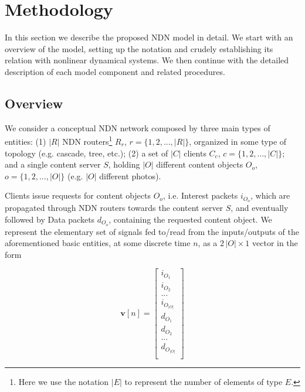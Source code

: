 \section{Methodology}
\label{sec:methodology}

In this section we describe the proposed NDN model in detail. We start with 
an overview of the model, setting up the notation and crudely establishing its relation 
with nonlinear dynamical systems. We then continue with the detailed description of 
each model component and related procedures.

\subsection{Overview}
\label{subsec:meth-overview}

We consider a conceptual NDN network composed by three main types of 
entities: (1) 
$|R|$ NDN routers\footnote{Here we use the notation $|E|$ to 
represent the number of elements of type $E$.} $R_r$, $r = \{1,2,...,|R|\}$, 
organized in some type of topology (e.g. cascade, tree, etc.); (2) a set of 
$|C|$ clients $C_c$, $c = \{1,2,...,|C|\}$; and a single 
content server $S$, holding $|O|$ different content objects $O_o$, 
$o = \{1,2,...,|O|\}$ (e.g. $|O|$ different photos).\shortvertbreak

Clients issue requests for content objects $O_o$, i.e. Interest packets $i_{O_o}$, which 
are propagated through NDN routers towards the content server $S$, and 
eventually followed by Data packets 
$d_{O_o}$, containing the requested content object. We represent the 
elementary set of signals fed to\slash read from the inputs\slash outputs of the 
aforementioned basic 
entities, at some discrete time $n$, as a $2\,|O| \times 1 $ vector in the form

\begin{equation}
    \textbf{v}[n] = \begin{bmatrix}  i_{O_1}         \\ 
                            i_{O_2}         \\ 
                             ...            \\ 
                            i_{O_{|O|}}     \\ 
                            d_{O_1}         \\ 
                            d_{O_2}         \\ 
                             ...            \\ 
                            d_{O_{|O|}}     \\ \end{bmatrix}
    \label{eq:signal}
\end{equation}\shortvertbreak

